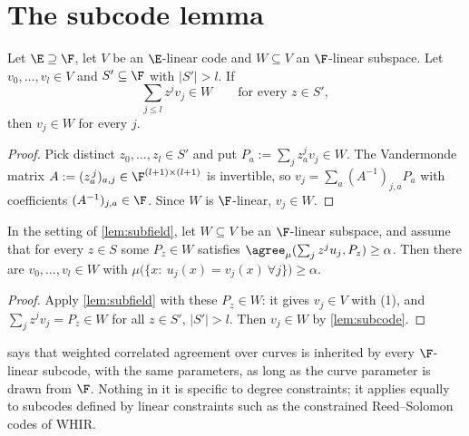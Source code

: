 \section{The subcode lemma}

\setcounter{lemma}{6}\begin{lemma}\label{lem:subcode}
Let $\E\supseteq\F$, let $V$ be an $\E$-linear code and $W\subseteq V$ an
$\F$-linear subspace. Let $v_0,\dots,v_l\in V$ and $S'\subseteq\F$ with $|S'|>l$. If
\[
\textstyle\sum_{j\le l}z^jv_j\in W\qquad\text{for every }z\in S',
\]
then $v_j\in W$ for every $j$.
\end{lemma}

\begin{proof}
Pick distinct $z_0,\dots,z_l\in S'$ and put $P_a:=\sum_jz_a^jv_j\in W$. The Vandermonde
matrix $A:=(z_a^{\,j})_{a,j}\in\F^{(l+1)\times(l+1)}$ is invertible, so
$v_j=\sum_a(A^{-1})_{j,a}P_a$ with coefficients $(A^{-1})_{j,a}\in\F$. Since $W$ is
$\F$-linear, $v_j\in W$.
\end{proof}

\begin{corollary}\label{cor:subcode}
In the setting of \cref{lem:subfield}, let $W\subseteq V$ be an $\F$-linear subspace, and
assume that for every $z\in S$ some $P_z\in W$ satisfies
$\agree_\mu(\sum_jz^ju_j,P_z)\ge\alpha$. Then there are $v_0,\dots,v_l\in W$ with
$\mu\big(\{x:\ u_j(x)=v_j(x)\ \forall j\}\big)\ge\alpha$.
\end{corollary}

\begin{proof}
Apply \cref{lem:subfield} with these $P_z\in W$: it gives $v_j\in V$ with (1), and
$\sum_jz^jv_j=P_z\in W$ for all $z\in S'$, $|S'|>l$. Then $v_j\in W$ by \cref{lem:subcode}.
\end{proof}

\begin{remark}
 says that weighted correlated agreement over curves is inherited by
every $\F$-linear subcode, with the same parameters, as long as the curve parameter is
drawn from $\F$. Nothing in it is specific to degree constraints; it applies equally to
subcodes defined by linear constraints such as the constrained Reed--Solomon codes of
WHIR.
\end{remark}
